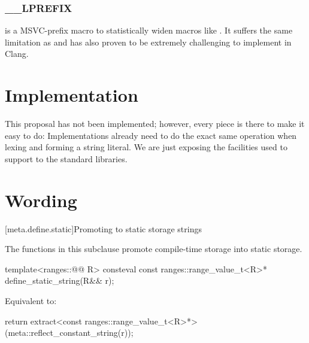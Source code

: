 \documentclass{wg21}
\begin{document}
\subsubsection{__LPREFIX}

 is a MSVC-prefix macro to statistically widen macros like .
It suffers the same limitation as  and has also proven to be extremely challenging to implement in Clang.


\section{Implementation}

This proposal has not been implemented; however, every piece is there to make it easy to do:
Implementations already need to do the exact same operation when lexing and forming a string literal.
We are just exposing the facilities used to support  to the standard libraries.

\section{Wording}


[meta.define.static]{Promoting to static storage strings}



\pnum
The functions in this subclause promote compile-time storage into static storage.

%
\begin{itemdecl}
template<ranges::@@ R>
consteval const ranges::range_value_t<R>* define_static_string(R&& r);
\end{itemdecl}

\begin{itemdescr}
\pnum
\effects
Equivalent to:
\begin{codeblock}
    return extract<const ranges::range_value_t<R>*>(meta::reflect_constant_string(r));
\end{codeblock}
\end{itemdescr}
\end{document}
